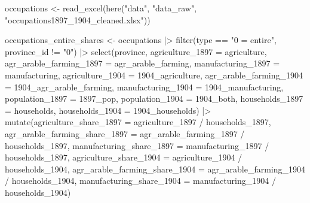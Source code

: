 \documentclass[
  9pt,
  letterpaper,
  DIV=11,
  numbers=noendperiod]{scrartcl}
\newenvironment{Shaded}{\begin{snugshade}}{\end{snugshade}}
\newcommand{\AttributeTok}[1]{\textcolor[rgb]{0.16,0.50,0.73}{#1}}
\newcommand{\FunctionTok}[1]{\textcolor[rgb]{0.56,0.27,0.68}{#1}}
\newcommand{\NormalTok}[1]{\textcolor[rgb]{0.81,0.81,0.76}{#1}}
\newcommand{\OtherTok}[1]{\textcolor[rgb]{0.15,0.68,0.38}{#1}}
\newcommand{\SpecialCharTok}[1]{\textcolor[rgb]{0.24,0.68,0.91}{#1}}
\newcommand{\StringTok}[1]{\textcolor[rgb]{0.96,0.31,0.31}{#1}}
\begin{document}
\begin{Shaded}
\begin{Highlighting}[]
\NormalTok{occupations }\OtherTok{\textless{}{-}} \FunctionTok{read\_excel}\NormalTok{(}\FunctionTok{here}\NormalTok{(}\StringTok{"data"}\NormalTok{, }\StringTok{"data\_raw"}\NormalTok{, }
                               \StringTok{"occupations1897\_1904\_cleaned.xlsx"}\NormalTok{))}

\NormalTok{occupations\_entire\_shares }\OtherTok{\textless{}{-}}\NormalTok{ occupations }\SpecialCharTok{|\textgreater{}} 
  \FunctionTok{filter}\NormalTok{(type }\SpecialCharTok{==} \StringTok{"0 = entire"}\NormalTok{,}
\NormalTok{         province\_id }\SpecialCharTok{!=} \StringTok{"0"}\NormalTok{) }\SpecialCharTok{|\textgreater{}} 
  \FunctionTok{select}\NormalTok{(province,}
         \AttributeTok{agriculture\_1897 =}\NormalTok{ agriculture, }
         \AttributeTok{agr\_arable\_farming\_1897 =}\NormalTok{ agr\_arable\_farming,}
         \AttributeTok{manufacturing\_1897 =}\NormalTok{ manufacturing,}
         \AttributeTok{agriculture\_1904 =} \StringTok{\textasciigrave{}}\AttributeTok{1904\_agriculture}\StringTok{\textasciigrave{}}\NormalTok{,}
         \AttributeTok{agr\_arable\_farming\_1904 =} \StringTok{\textasciigrave{}}\AttributeTok{1904\_agr\_arable\_farming}\StringTok{\textasciigrave{}}\NormalTok{,}
         \AttributeTok{manufacturing\_1904 =} \StringTok{\textasciigrave{}}\AttributeTok{1904\_manufacturing}\StringTok{\textasciigrave{}}\NormalTok{,}
         \AttributeTok{population\_1897 =} \StringTok{\textasciigrave{}}\AttributeTok{1897\_pop}\StringTok{\textasciigrave{}}\NormalTok{,}
         \AttributeTok{population\_1904 =} \StringTok{\textasciigrave{}}\AttributeTok{1904\_both}\StringTok{\textasciigrave{}}\NormalTok{,}
         \AttributeTok{households\_1897 =}\NormalTok{ households,}
         \AttributeTok{households\_1904 =} \StringTok{\textasciigrave{}}\AttributeTok{1904\_households}\StringTok{\textasciigrave{}}\NormalTok{) }\SpecialCharTok{|\textgreater{}} 
  \FunctionTok{mutate}\NormalTok{(}\AttributeTok{agriculture\_share\_1897 =}\NormalTok{ agriculture\_1897 }\SpecialCharTok{/}\NormalTok{ households\_1897,}
         \AttributeTok{agr\_arable\_farming\_share\_1897 =}\NormalTok{ agr\_arable\_farming\_1897 }\SpecialCharTok{/}\NormalTok{ households\_1897,}
         \AttributeTok{manufacturing\_share\_1897 =}\NormalTok{ manufacturing\_1897 }\SpecialCharTok{/}\NormalTok{ households\_1897,}
         \AttributeTok{agriculture\_share\_1904 =}\NormalTok{ agriculture\_1904 }\SpecialCharTok{/}\NormalTok{ households\_1904,}
         \AttributeTok{agr\_arable\_farming\_share\_1904 =}\NormalTok{ agr\_arable\_farming\_1904 }\SpecialCharTok{/}\NormalTok{ households\_1904,}
         \AttributeTok{manufacturing\_share\_1904 =}\NormalTok{ manufacturing\_1904 }\SpecialCharTok{/}\NormalTok{ households\_1904)}


\end{Highlighting}
\end{Shaded}
\end{document}
